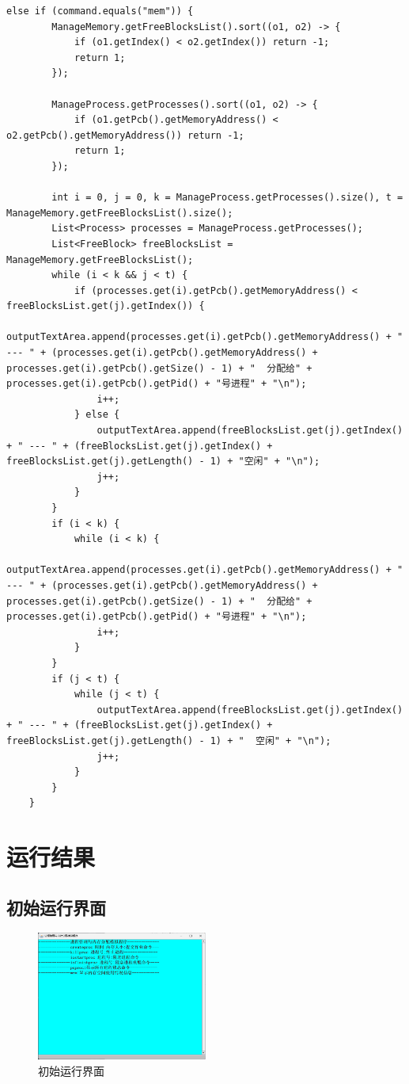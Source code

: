 \documentclass[UTF8,12pt]{article}
\begin{document}
\begin{lstlisting}[title=键入mem,frame=shadowbox]
    else if (command.equals("mem")) {
        ManageMemory.getFreeBlocksList().sort((o1, o2) -> {
            if (o1.getIndex() < o2.getIndex()) return -1;
            return 1;
        });

        ManageProcess.getProcesses().sort((o1, o2) -> {
            if (o1.getPcb().getMemoryAddress() < o2.getPcb().getMemoryAddress()) return -1;
            return 1;
        });

        int i = 0, j = 0, k = ManageProcess.getProcesses().size(), t = ManageMemory.getFreeBlocksList().size();
        List<Process> processes = ManageProcess.getProcesses();
        List<FreeBlock> freeBlocksList = ManageMemory.getFreeBlocksList();
        while (i < k && j < t) {
            if (processes.get(i).getPcb().getMemoryAddress() < freeBlocksList.get(j).getIndex()) {
                outputTextArea.append(processes.get(i).getPcb().getMemoryAddress() + " --- " + (processes.get(i).getPcb().getMemoryAddress() + processes.get(i).getPcb().getSize() - 1) + "  分配给" + processes.get(i).getPcb().getPid() + "号进程" + "\n");
                i++;
            } else {
                outputTextArea.append(freeBlocksList.get(j).getIndex() + " --- " + (freeBlocksList.get(j).getIndex() + freeBlocksList.get(j).getLength() - 1) + "空闲" + "\n");
                j++;
            }
        }
        if (i < k) {
            while (i < k) {
                outputTextArea.append(processes.get(i).getPcb().getMemoryAddress() + " --- " + (processes.get(i).getPcb().getMemoryAddress() + processes.get(i).getPcb().getSize() - 1) + "  分配给" + processes.get(i).getPcb().getPid() + "号进程" + "\n");
                i++;
            }
        }
        if (j < t) {
            while (j < t) {
                outputTextArea.append(freeBlocksList.get(j).getIndex() + " --- " + (freeBlocksList.get(j).getIndex() + freeBlocksList.get(j).getLength() - 1) + "  空闲" + "\n");
                j++;
            }
        }
    }
\end{lstlisting}


\section{运行结果}
\subsection{初始运行界面}
\begin{figure}[htbp]
    \centering
    \includegraphics[width=0.5\textwidth]{img/1.png}
    \caption{初始运行界面}
\end{figure}
\end{document}
